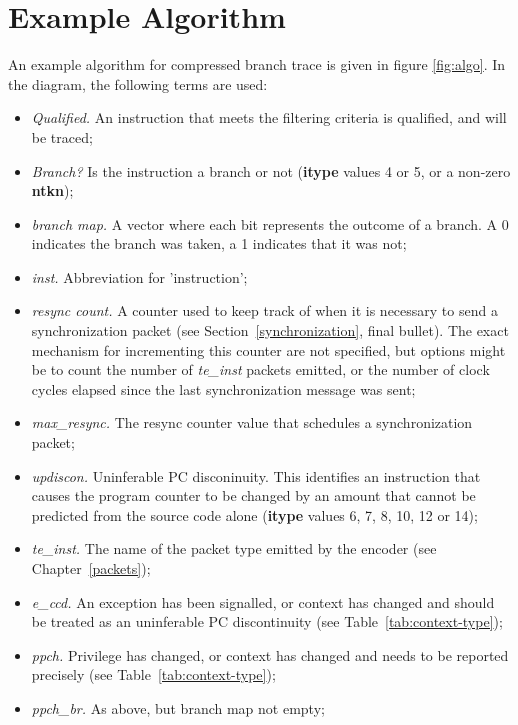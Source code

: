 \chapter{Example Algorithm} \label{Algorithm}

An example algorithm for compressed branch trace is given in figure
\ref{fig:algo}. In the diagram, the following terms are used:

\begin{itemize}
  \item \textit{Qualified.}  An instruction that meets the filtering criteria is qualified, and will be traced;
  \item \textit{Branch?} Is the instruction a branch or not (\textbf{itype} values 4 or 5, or a non-zero \textbf{ntkn});
  \item \textit{branch map.}  A vector where each bit represents the outcome of a branch.  A 0 indicates the
    branch was taken, a 1 indicates that it was not;
  \item \textit{inst.}  Abbreviation for 'instruction';
  \item \textit{resync count.} A counter used to keep track of when it is necessary to send 
    a synchronization packet (see Section~\ref{synchronization}, final bullet). The exact mechanism for 
    incrementing this counter are not specified, but options might be to count the number of \textit{te\_inst} packets emitted, 
    or the number of clock cycles elapsed since the last synchronization message was sent;
  \item \textit{max\_resync.}  The resync counter value that schedules a synchronization packet;
  \item \textit{updiscon.}  Uninferable PC disconinuity.  This identifies an instruction that
    causes the program counter to be changed by an amount that cannot be predicted from the
    source code alone (\textbf{itype} values 6, 7, 8, 10, 12 or 14);
   \item \textit{te\_inst.} The name of the packet type emitted by the encoder (see Chapter~\ref{packets});
   \item \textit{e\_ccd.} An exception has been signalled, or context has changed and
     should be treated as an uninferable PC discontinuity (see Table~\ref{tab:context-type});
   \item \textit{ppch.} Privilege has changed, or context has changed and needs to be 
     reported precisely (see Table~\ref{tab:context-type});
   \item \textit{ppch\_br.} As above, but branch map not empty;

\end{itemize}
